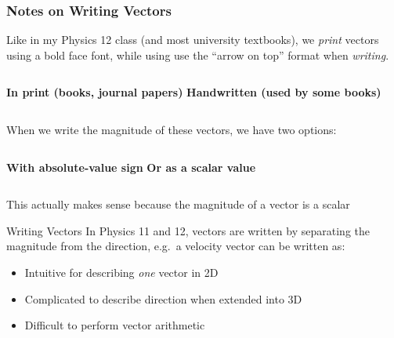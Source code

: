 \documentclass[12pt,compress,aspectratio=169]{beamer}
\newcommand{\mb}[1]{\ensuremath\mathbf{#1}}
\newcommand{\eq}[2]{\vspace{#1}{\Large\begin{displaymath}#2\end{displaymath}}}
\begin{document}
\begin{frame}
  \frametitle{Notes on  Writing Vectors}
  Like in my Physics 12 class (and most university textbooks), we \emph{print}
  vectors using a bold face font, while using use the ``arrow on top'' format
  when \emph{writing}.
  \vspace{0.1in}
  \begin{columns}
    \textbf{In print (books, journal papers)}
    \textbf{Handwritten (used by some books)}
  \end{columns}

  When we write the magnitude of these vectors, we have two options:
  \vspace{0.1in}
  \begin{columns}
    \textbf{With absolute-value sign}
    \textbf{Or as a scalar value}
      \vspace{-0.2in}{\LARGE
        \begin{displaymath}
          v\quad F_g\quad p \quad I
        \end{displaymath}
      }
  \end{columns}

  This actually makes sense because the magnitude of a vector is a scalar
\end{frame}


\begin{frame}{Writing Vectors}
  In Physics 11 and 12, vectors are written by separating the magnitude from
  the direction, e.g.\ a velocity vector can be written as:
  
  \eq{-.1in}{
    \mb{v}=\SI{4.5}{m/s}\text{ [N \ang{55} E]}
  }

  \begin{itemize}
  \item Intuitive for describing \emph{one} vector in 2D
  \item Complicated to describe direction when extended into 3D
  \item Difficult to perform vector arithmetic
  \end{itemize}
\end{frame}
\end{document}
